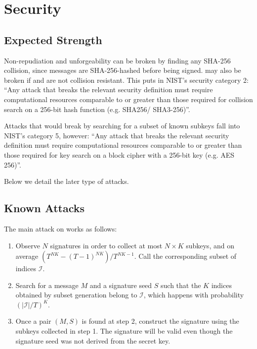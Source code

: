 \chapter{Security}\label{chap:security}

\section{Expected Strength}

Non-repudiation and unforgeability can be broken by finding any SHA-256 collision, since messages are SHA-256-hashed before being signed.
\gravity may also be broken if \hashx and \hashy are not collision resistant.
This puts \gravity in NIST's security category 2: ``Any attack that breaks the relevant security definition must require computational resources comparable to or greater than those required for collision search on a 256-bit hash function (e.g. SHA256/ SHA3-256)''.

Attacks that would break \gravity by searching for a subset of known subkeys fall into NIST's category 5, however: ``Any attack that breaks the relevant security definition must require computational resources comparable to or greater than those required for key search on a block cipher with a 256-bit key (e.g. AES 256)''.

Below we detail the later type of attacks.

\section{Known Attacks}\label{sec:attacks}

The main attack on \gravity works as follows:
\begin{enumerate}

    \item Observe $N$ signatures in order to collect at most $N\times K$ subkeys, and on average $(T^{NK} - (T-1)^{NK}) / T^{NK-1}$. Call the corresponding subset of indices $\mathcal{I}$.
    \item Search for a message $M$ and a signature seed $S$ such that the $K$ indices obtained by subset generation belong to $\mathcal I$, which happens with probability $(\vert\mathcal{I}\vert / T)^K$.
    \item Once a pair $(M,S)$ is found at step 2, construct the signature using the subkeys collected in step 1. The signature will be valid even though the signature seed was not derived from the secret key.
\end{enumerate}

